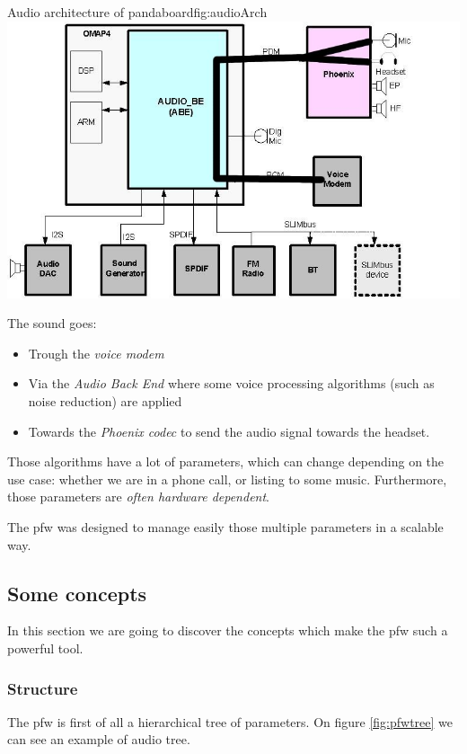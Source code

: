 \begin{figureGraphics}{Audio architecture of pandaboard}{fig:audioArch}
    \includegraphics[height=0.5\textheight]{./src/img/Audio_arch2.jpg}
\end{figureGraphics}

The sound goes:
\begin{itemize}
    \item Trough the \emph{voice modem}
    \item Via the \emph{Audio Back End} where some voice processing algorithms (such as noise reduction) are applied
    \item Towards the \emph{Phoenix codec} to send the audio signal towards the headset.
\end{itemize}

Those algorithms have a lot of parameters, which can change depending on the use case: whether we are in a phone call,
or listing to some music. Furthermore, those parameters are \emph{often hardware dependent}.

The \gls{pfw} was designed to manage easily those multiple parameters in a scalable way.

\subsection{Some concepts}
In this section we are going to discover the concepts which make the
\gls{pfw} such a powerful tool.

\subsubsection{Structure}
The \gls{pfw} is first of all a hierarchical tree of parameters.
On figure \ref{fig:pfwtree} we can see an example of audio tree.

